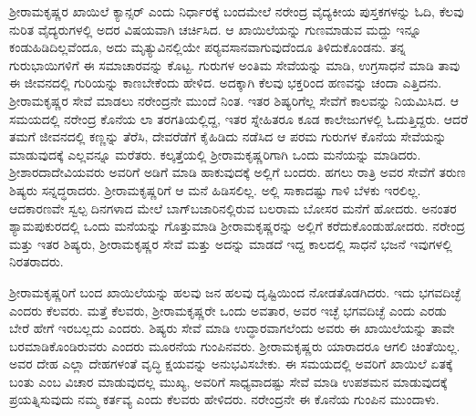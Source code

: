 ಶ‍್ರೀರಾಮಕೃಷ್ಣರ ಖಾಯಿಲೆ ಕ್ಯಾನ್ಸರ್ ಎಂದು ನಿರ್ಧಾರಕ್ಕೆ ಬಂದಮೇಲೆ ನರೇಂದ್ರ ವೈದ್ಯಕೀಯ ಪುಸ್ತಕಗಳನ್ನು ಓದಿ, ಕೆಲವು ನುರಿತ ವೈದ್ಯರುಗಳಲ್ಲಿ ಅದರ ವಿಷಯವಾಗಿ ಚರ್ಚಿಸಿದ. ಆ ಖಾಯಿಲೆಯನ್ನು ಗುಣಮಾಡುವ ಮದ್ದು ಇನ್ನೂ ಕಂಡುಹಿಡಿದಿಲ್ಲವೆಂದೂ, ಅದು ಮೃತ್ಯುವಿನಲ್ಲಿಯೇ ಪರ‍್ಯವಸಾನವಾಗುವುದೆಂದೂ ತಿಳಿದುಕೊಂಡನು. ತನ್ನ ಗುರುಭಾಯಿಗಳಿಗೆ ಈ ಸಮಾಚಾರವನ್ನು ಕೊಟ್ಟ. ಗುರುಗಳ ಅಂತಿಮ ಸೇವೆಯನ್ನು ಮಾಡಿ, ಉಗ್ರಸಾಧನೆ ಮಾಡಿ ತಾವು ಈ ಜೀವನದಲ್ಲಿ ಗುರಿಯನ್ನು ಕಾಣಬೇಕೆಂದು ಹೇಳಿದ. ಅದಕ್ಕಾಗಿ ಕೆಲವು ಭಕ್ತರಿಂದ ಹಣವನ್ನು ಚಂದಾ ಎತ್ತಿದನು. ಶ‍್ರೀರಾಮಕೃಷ್ಣರ ಸೇವೆ ಮಾಡಲು ನರೇಂದ್ರನೇ ಮುಂದೆ ನಿಂತ. ಇತರ ಶಿಷ್ಯರಿಗೆಲ್ಲ ಸೇವೆಗೆ ಕಾಲವನ್ನು ನಿಯಮಿಸಿದ. ಆ ಸಮಯದಲ್ಲಿ ನರೇಂದ್ರ ಕೊನೆಯ ಲಾ ತರಗತಿಯಲ್ಲಿದ್ದ, ಇತರ ಸ್ನೇಹಿತರೂ ಕೂಡ ಕಾಲೇಜುಗಳಲ್ಲಿ ಓದುತ್ತಿದ್ದರು. ಆದರೆ ತಮಗೆ ಜೀವನದಲ್ಲಿ ಕಣ್ಣನ್ನು ತೆರೆಸಿ, ದೇವರೆಡೆಗೆ ಕೈಹಿಡಿದು ನಡೆಸಿದ ಆ ಪರಮ ಗುರುಗಳ ಕೊನೆಯ ಸೇವೆಯನ್ನು ಮಾಡುವುದಕ್ಕೆ ಎಲ್ಲವನ್ನೂ ಮರೆತರು. ಕಲ್ಕತ್ತೆಯಲ್ಲಿ ಶ‍್ರೀರಾಮಕೃಷ್ಣರಿಗಾಗಿ ಒಂದು ಮನೆಯನ್ನು ಮಾಡಿದರು. ಶ‍್ರೀಶಾರದಾದೇವಿಯವರು ಅವರಿಗೆ ಅಡಿಗೆ ಮಾಡಿ ಹಾಕುವುದಕ್ಕೆ ಅಲ್ಲಿಗೆ ಬಂದರು. ಹಗಲು ರಾತ್ರಿ ಅವರ ಸೇವೆಗೆ ತರುಣ ಶಿಷ್ಯರು ಸನ್ನದ್ಧರಾದರು. ಶ‍್ರೀರಾಮಕೃಷ್ಣರಿಗೆ ಆ ಮನೆ ಹಿಡಿಸಲಿಲ್ಲ. ಅಲ್ಲಿ ಸಾಕಾದಷ್ಟು ಗಾಳಿ ಬೆಳಕು ಇರಲಿಲ್ಲ. ಆದಕಾರಣವೇ ಸ್ವಲ್ಪ ದಿನಗಳಾದ ಮೇಲೆ ಬಾಗ್‍ಬಜಾರಿನಲ್ಲಿರುವ ಬಲರಾಮ ಬೋಸರ ಮನೆಗೆ ಹೋದರು. ಅನಂತರ ಶ್ಯಾಮಪುಕುರದಲ್ಲಿ ಒಂದು ಮನೆಯನ್ನು ಗೊತ್ತುಮಾಡಿ ಶ‍್ರೀರಾಮಕೃಷ್ಣರನ್ನು ಅಲ್ಲಿಗೆ ಕರೆದುಕೊಂಡುಹೋದರು. ನರೇಂದ್ರ ಮತ್ತು ಇತರ ಶಿಷ್ಯರು, ಶ‍್ರೀರಾಮಕೃಷ್ಣರ ಸೇವೆ ಮತ್ತು ಅದನ್ನು ಮಾಡದೆ ಇದ್ದ ಕಾಲದಲ್ಲಿ ಸಾಧನೆ ಭಜನೆ ಇವುಗಳಲ್ಲಿ ನಿರತರಾದರು.

ಶ‍್ರೀರಾಮಕೃಷ್ಣರಿಗೆ ಬಂದ ಖಾಯಿಲೆಯನ್ನು ಹಲವು ಜನ ಹಲವು ದೃಷ್ಟಿಯಿಂದ ನೋಡತೊಡಗಿದರು. ಇದು ಭಗವದಿಚ್ಛೆ ಎಂದರು ಕೆಲವರು. ಮತ್ತೆ ಕೆಲವರು, ಶ‍್ರೀರಾಮಕೃಷ್ಣರೇ ಒಂದು ಅವತಾರ, ಅವರ ಇಚ್ಛೆ ಭಗವದಿಚ್ಛೆ ಎಂದು ಎರಡು ಬೇರೆ ಹೇಗೆ ಇರಬಲ್ಲದು ಎಂದರು. ಶಿಷ್ಯರು ಸೇವೆ ಮಾಡಿ ಉದ್ಧಾರವಾಗಲೆಂದು ಅವರು ಈ ಖಾಯಿಲೆಯನ್ನು ತಾವೇ ಬರಮಾಡಿಕೊಂಡಿರುವರು ಎಂದರು ಮೂರನೆಯ ಗುಂಪಿನವರು. ಶ‍್ರೀರಾಮಕೃಷ್ಣರು ಯಾರಾದರೂ ಆಗಲಿ ಚಿಂತೆಯಿಲ್ಲ. ಅವರ ದೇಹ ಎಲ್ಲಾ ದೇಹಗಳಂತೆ ವೃದ್ಧಿ ಕ್ಷಯವನ್ನು ಅನುಭವಿಸಬೇಕು. ಈ ಸಮಯದಲ್ಲಿ ಅವರಿಗೆ ಖಾಯಿಲೆ ಏತಕ್ಕೆ ಬಂತು ಎಂಬ ವಿಚಾರ ಮಾಡುವುದಲ್ಲ ಮುಖ್ಯ, ಅವರಿಗೆ ಸಾಧ್ಯವಾದಷ್ಟು ಸೇವೆ ಮಾಡಿ ಉಪಶಮನ ಮಾಡುವುದಕ್ಕೆ ಪ್ರಯತ್ನಿಸುವುದು ನಮ್ಮ ಕರ್ತವ್ಯ ಎಂದು ಕೆಲವರು ಹೇಳಿದರು. ನರೇಂದ್ರನೇ ಈ ಕೊನೆಯ ಗುಂಪಿನ ಮುಂದಾಳು.

